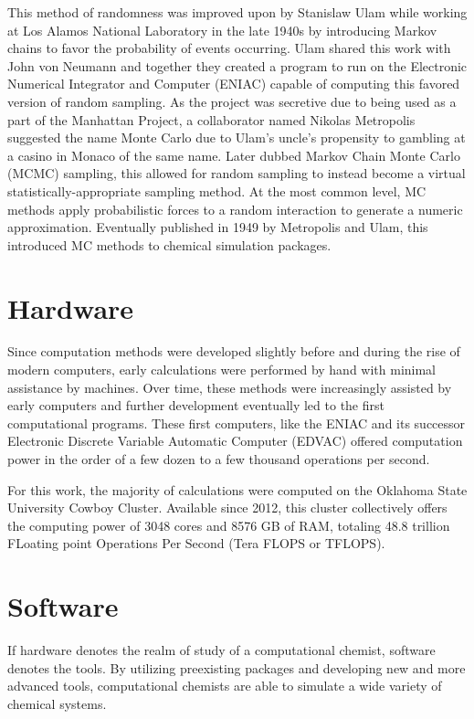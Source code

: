 This method of randomness was improved upon by Stanislaw Ulam while working at Los Alamos National Laboratory in the late 1940s by introducing Markov chains to favor the probability of events occurring.
Ulam shared this work with John von Neumann and together they created a program to run on the Electronic Numerical Integrator and Computer (ENIAC) capable of computing this favored version of random sampling.
As the project was secretive due to being used as a part of the Manhattan Project, a collaborator named Nikolas Metropolis suggested the name Monte Carlo due to Ulam's uncle's propensity to gambling at a casino in Monaco of the same name.\cite{MCOrigins}
Later dubbed Markov Chain Monte Carlo (MCMC) sampling, this allowed for random sampling to instead become a virtual statistically-appropriate sampling method.
At the most common level, MC methods apply probabilistic forces to a random interaction to generate a numeric approximation.
Eventually published in 1949 by Metropolis and Ulam, this introduced MC methods to chemical simulation packages. 



\section{Hardware}

Since computation methods were developed slightly before and during the rise of modern computers, early calculations were performed by hand with minimal assistance by machines. 
Over time, these methods were increasingly assisted by early computers and further development eventually led to the first computational programs.
These first computers, like the ENIAC and its successor Electronic Discrete Variable Automatic Computer (EDVAC) offered computation power in the order of a few dozen to a few thousand operations per second.

For this work, the majority of calculations were computed on the Oklahoma State University Cowboy Cluster. 
Available since 2012, this cluster collectively offers the computing power of 3048 cores and 8576 GB of RAM, totaling 48.8 trillion FLoating point Operations Per Second (Tera FLOPS or TFLOPS). 

\section{Software}

If hardware denotes the realm of study of a computational chemist, software denotes the tools. 
By utilizing preexisting packages and developing new and more advanced tools, computational chemists are able to simulate a wide variety of chemical systems.

